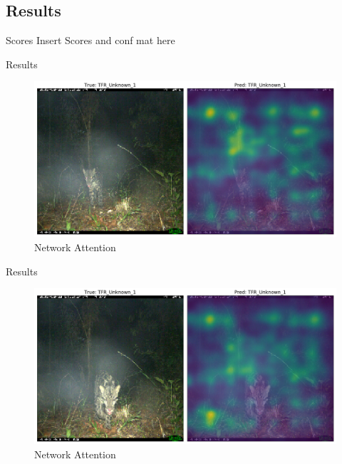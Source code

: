 \documentclass[10pt]{beamer}
\begin{document}
\subsection{Results}

\begin{frame}{Scores}
	Insert Scores and conf mat here
\end{frame}

\begin{frame}{Results}
	\begin{figure}
		\includegraphics[width=\columnwidth]{images/result_leo_1.png}
		\caption{Network Attention}
	\end{figure}
\end{frame}



\begin{frame}{Results}
	\begin{figure}
		\includegraphics[width=\columnwidth]{images/result_leo_2.png}
		\caption{Network Attention}
	\end{figure}
\end{frame}
\end{document}
